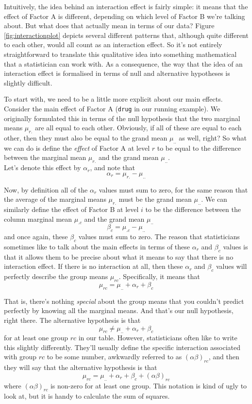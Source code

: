\documentclass[
]{book}
\theoremstyle{definition}
\theoremstyle{definition}
\theoremstyle{definition}
\theoremstyle{definition}
\theoremstyle{remark}
\begin{document}
Intuitively, the idea behind an interaction effect is fairly simple: it means that the effect of Factor A is different, depending on which level of Factor B we're talking about. But what does that actually mean in terms of our data? Figure \ref{fig:interactionplot} depicts several different patterns that, although quite different to each other, would all count as an interaction effect. So it's not entirely straightforward to translate this qualitative idea into something mathematical that a statistician can work with. As a consequence, the way that the idea of an interaction effect is formalised in terms of null and alternative hypotheses is slightly difficult.

To start with, we need to be a little more explicit about our main effects. Consider the main effect of Factor A (\texttt{drug} in our running example). We originally formulated this in terms of the null hypothesis that the two marginal means \(\mu_{r.}\) are all equal to each other. Obviously, if all of these are equal to each other, then they must also be equal to the grand mean \(\mu_{..}\) as well, right? So what we can do is define the \emph{effect} of Factor A at level \(r\) to be equal to the difference between the marginal mean \(\mu_{r.}\) and the grand mean \(\mu_{..}\).\\
Let's denote this effect by \(\alpha_r\), and note that
\[
\alpha_r  = \mu_{r.} - \mu_{..} 
\]

Now, by definition all of the \(\alpha_r\) values must sum to zero, for the same reason that the average of the marginal means \(\mu_{r.}\) must be the grand mean \(\mu_{..}\). We can similarly define the effect of Factor B at level \(i\) to be the difference between the column marginal mean \(\mu_{.c}\) and the grand mean \(\mu_{..}\)
\[
\beta_c = \mu_{.c} - \mu_{..}
\]
and once again, these \(\beta_c\) values must sum to zero. The reason that statisticians sometimes like to talk about the main effects in terms of these \(\alpha_r\) and \(\beta_c\) values is that it allows them to be precise about what it means to say that there is no interaction effect. If there is no interaction at all, then these \(\alpha_r\) and \(\beta_c\) values will perfectly describe the group means \(\mu_{rc}\). Specifically, it means that
\[
\mu_{rc} = \mu_{..} + \alpha_r + \beta_c 
\]

That is, there's nothing \emph{special} about the group means that you couldn't predict perfectly by knowing all the marginal means. And that's our null hypothesis, right there. The alternative hypothesis is that
\[
\mu_{rc} \neq \mu_{..} + \alpha_r + \beta_c 
\]
for at least one group \(rc\) in our table. However, statisticians often like to write this slightly differently. They'll usually define the specific interaction associated with group \(rc\) to be some number, awkwardly referred to as \((\alpha\beta)_{rc}\), and then they will say that the alternative hypothesis is that
\[\mu_{rc} = \mu_{..} + \alpha_r + \beta_c + (\alpha\beta)_{rc}\]
where \((\alpha\beta)_{rc}\) is non-zero for at least one group. This notation is kind of ugly to look at, but it is handy to calculate the sum of squares.
\end{document}
